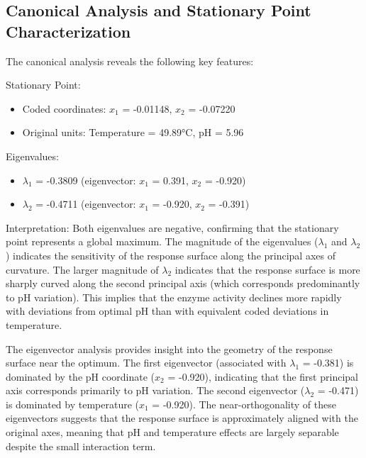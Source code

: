 \documentclass[
  12pt,
]{article}
\providecommand{\tightlist}{%
  \setlength{\itemsep}{0pt}\setlength{\parskip}{0pt}}
\begin{document}
\subsection{Canonical Analysis and Stationary Point
Characterization}\label{canonical-analysis-and-stationary-point-characterization}

The canonical analysis reveals the following key features:

Stationary Point:

\begin{itemize}
\tightlist
\item
  Coded coordinates: \(x_1\) = -0.01148, \(x_2\) = -0.07220
\item
  Original units: Temperature = 49.89°C, pH = 5.96
\end{itemize}

Eigenvalues:

\begin{itemize}
\tightlist
\item
  \(\lambda_1\) = -0.3809 (eigenvector: \(x_1\) = 0.391, \(x_2\) =
  -0.920)
\item
  \(\lambda_2\) = -0.4711 (eigenvector: \(x_1\) = -0.920, \(x_2\) =
  -0.391)
\end{itemize}

Interpretation: Both eigenvalues are negative, confirming that the
stationary point represents a global maximum. The magnitude of the
eigenvalues (\(\lambda_1\) and \(\lambda_2\)) indicates the sensitivity
of the response surface along the principal axes of curvature. The
larger magnitude of \(\lambda_2\) indicates that the response surface is
more sharply curved along the second principal axis (which corresponds
predominantly to pH variation). This implies that the enzyme activity
declines more rapidly with deviations from optimal pH than with
equivalent coded deviations in temperature.

The eigenvector analysis provides insight into the geometry of the
response surface near the optimum. The first eigenvector (associated
with \(\lambda_1\) = -0.381) is dominated by the pH coordinate (\(x_2\)
= -0.920), indicating that the first principal axis corresponds
primarily to pH variation. The second eigenvector (\(\lambda_2\) =
-0.471) is dominated by temperature (\(x_1\) = -0.920). The
near-orthogonality of these eigenvectors suggests that the response
surface is approximately aligned with the original axes, meaning that pH
and temperature effects are largely separable despite the small
interaction term.
\end{document}
